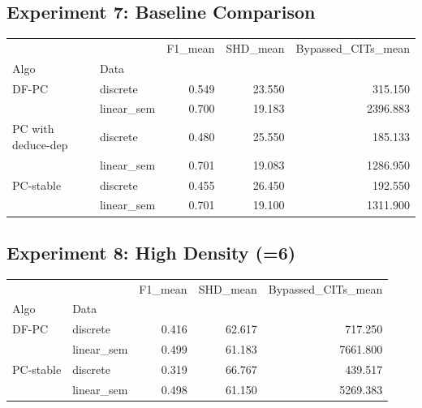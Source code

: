 \subsection*{Experiment 7: Baseline Comparison}
\begin{tabular}{llrrr}
\toprule
          &            &  F1\_mean &  SHD\_mean &  Bypassed\_CITs\_mean \\
Algo & Data &          &           &                     \\
\midrule
DF-PC & discrete &    0.549 &    23.550 &             315.150 \\
          & linear\_sem &    0.700 &    19.183 &            2396.883 \\
PC with deduce-dep & discrete &    0.480 &    25.550 &             185.133 \\
          & linear\_sem &    0.701 &    19.083 &            1286.950 \\
PC-stable & discrete &    0.455 &    26.450 &             192.550 \\
          & linear\_sem &    0.701 &    19.100 &            1311.900 \\
\bottomrule
\end{tabular}


\subsection*{Experiment 8: High Density (=6)}
\begin{tabular}{llrrr}
\toprule
          &            &  F1\_mean &  SHD\_mean &  Bypassed\_CITs\_mean \\
Algo & Data &          &           &                     \\
\midrule
DF-PC & discrete &    0.416 &    62.617 &             717.250 \\
          & linear\_sem &    0.499 &    61.183 &            7661.800 \\
PC-stable & discrete &    0.319 &    66.767 &             439.517 \\
          & linear\_sem &    0.498 &    61.150 &            5269.383 \\
\bottomrule
\end{tabular}


